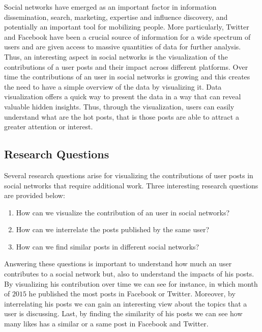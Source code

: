 Social networks have emerged as an important factor in information dissemination, search, marketing, expertise and influence discovery, and potentially an important tool for mobilizing people. More particularly, Twitter and Facebook have been a crucial source of information for a wide spectrum of users and are given access to massive quantities of data for further analysis. Thus, an interesting aspect in social networks is the visualization of the contributions of a user posts and their impact across different platforms. Over time the contributions of an user in social networks is growing and this creates the need to have a simple overview of the data by visualizing it. Data visualization offers a quick way to present the data in a way that can reveal valuable hidden insights. Thus, through the visualization, users can easily understand what are the hot posts, that is those posts are able to attract a greater attention or interest.


\subsection{Research Questions}


Several research questions arise for visualizing the contributions of user posts in social networks that require additional work. Three interesting research questions are provided below:


\begin{enumerate}
\item How can we visualize the contribution of an user in social networks?
\item How can we interrelate the posts published by the same user?
\item How can we find similar posts in different social networks?
\end{enumerate}


Answering these questions is important to understand how much an user contributes to a social network but, also to understand the impacts of his posts. By visualizing his contribution over time we can see for instance, in which month of $2015$  he published  the most posts in Facebook or Twitter. Moreover, by interrelating his posts we can gain an interesting view about the topics that a user is discussing. Last, by finding the similarity of his posts we can see how many likes has a similar or a same post in Facebook and Twitter.


